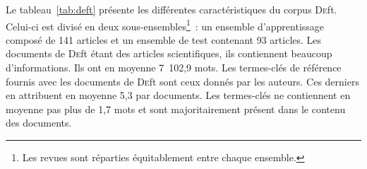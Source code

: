     Le tableau~\ref{tab:deft} présente les différentes caractéristiques du
    corpus \textsc{De}ft. Celui-ci est divisé en deux
    sous-ensembles\footnote{Les revues sont réparties équitablement entre chaque
    ensemble.}~: un ensemble d'apprentissage composé de 141 articles et un
    ensemble de test contenant 93 articles. Les documents de \textsc{De}ft étant
    des articles scientifiques, ils contiennent beaucoup d'informations. Ils ont
    en moyenne 7~102,9 mots. Les termes-clés de référence fournis avec les
    documents de \textsc{De}ft sont ceux donnés par les auteurs. Ces derniers en
    attribuent en moyenne 5,3 par documents. Les termes-clés ne contiennent en
    moyenne pas plus de 1,7 mots et sont majoritairement présent dans le contenu
    des documents.
    \begin{table}[!h]
      \centering
      \caption{Corpus \textsc{De}ft
               \label{tab:deft}}
    \end{table}


